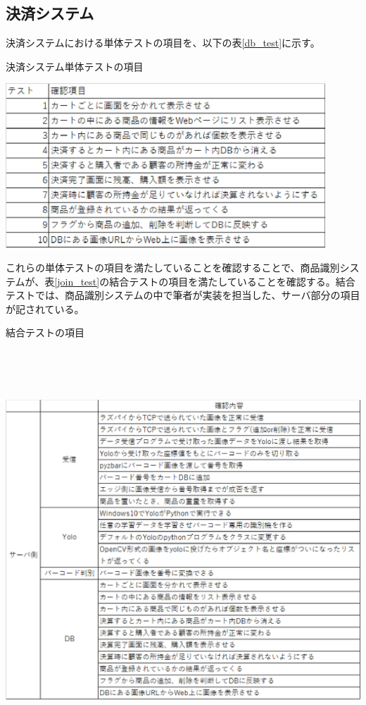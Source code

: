 \subsection*{決済システム}
決済システムにおける単体テストの項目を、以下の表\ref{db_test}に示す。
\begin{table}[htbp]
\centering
\caption{決済システム単体テストの項目}
\includegraphics[width=12cm]{./pic/db_test.eps}
\label{db_test}
\end{table}

\newpage

これらの単体テストの項目を満たしていることを確認することで、商品識別システムが、表\ref{join_test}の結合テストの項目を満たしていることを確認する。結合テストでは、商品識別システムの中で筆者が実装を担当した、サーバ部分の項目が記されている。

\begin{table}[htbp]
\centering
\caption{結合テストの項目}
\includegraphics[height=15cm,width=15cm]{./pic/join_test.eps}
\label{join_test}
\end{table}

